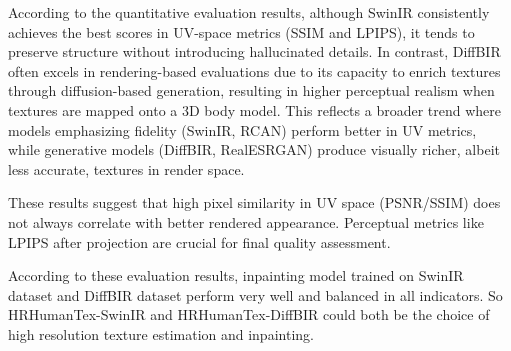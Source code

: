 According to the quantitative evaluation results, although SwinIR consistently achieves the best scores in UV-space metrics (SSIM and LPIPS), it tends to preserve structure without introducing hallucinated details. In contrast, DiffBIR often excels in rendering-based evaluations due to its capacity to enrich textures through diffusion-based generation, resulting in higher perceptual realism when textures are mapped onto a 3D body model.
This reflects a broader trend where models emphasizing fidelity (SwinIR, RCAN) perform better in UV metrics, while generative models (DiffBIR, RealESRGAN) produce visually richer, albeit less accurate, textures in render space.

These results suggest that high pixel similarity in UV space (PSNR/SSIM) does not always correlate with better rendered appearance. Perceptual metrics like LPIPS after projection are crucial for final quality assessment.

According to these evaluation results, inpainting model trained on SwinIR dataset and DiffBIR dataset perform very well and balanced in all indicators. So HRHumanTex-SwinIR and HRHumanTex-DiffBIR could both be the choice of high resolution texture estimation and inpainting.

